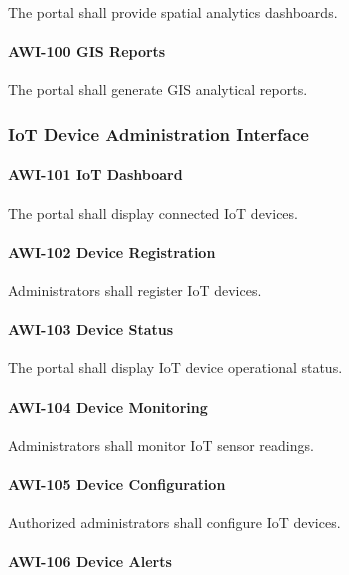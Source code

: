 The portal shall provide spatial analytics dashboards.

\paragraph{AWI-100 GIS Reports}

The portal shall generate GIS analytical reports.


\subsubsection*{IoT Device Administration Interface}

\paragraph{AWI-101 IoT Dashboard}

The portal shall display connected IoT devices.

\paragraph{AWI-102 Device Registration}

Administrators shall register IoT devices.

\paragraph{AWI-103 Device Status}

The portal shall display IoT device operational status.

\paragraph{AWI-104 Device Monitoring}

Administrators shall monitor IoT sensor readings.

\paragraph{AWI-105 Device Configuration}

Authorized administrators shall configure IoT devices.

\paragraph{AWI-106 Device Alerts}

